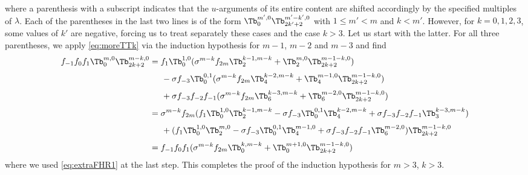 \documentclass[11pt]{article}
\numberwithin{equation}{section}
\theoremstyle{plain}
\numberwithin{equation}{section}
\renewcommand{\le}{\leqslant}
\begin{document}
where a parenthesis with a subscript indicates that the $u$-arguments of its entire content are shifted accordingly by the specified multiples of $\lambda$. Each of the parentheses in the last two lines is of the form $\Tb^{m',0}_0 \Tb^{m'-k',0}_{2k'+2}$ with $1\le m'<m$ and $k<m'$. However, for $k=0,1,2,3$, some values of $k'$ are negative, forcing us to treat separately these cases and the case $k>3$. Let us start with the latter. For all three parentheses, we apply \eqref{eq:moreTTk} via the induction hypothesis for $m\!-\!1$, $m\!-\!2$ and $m\!-\!3$ and find
\begingroup
\allowdisplaybreaks
\begin{alignat}{2}
f_{-1}f_0f_1\Tb^{m,0}_0 \Tb^{m-k,0}_{2k+2} &= f_1\Tb^{1,0}_0 (\sigma^{m-k}f_{2m} \Tb^{k-1,m-k}_2 + \Tb^{m,0}_2 \Tb^{m-1-k,0}_{2k+2}) 
\nonumber\\[0.1cm]&\hspace{0.5cm}
- \sigma f_{-3} \Tb^{0,1}_0(\sigma^{m-k}f_{2m} \Tb^{k-2,m-k}_4 + \Tb^{m-1,0}_4 \Tb^{m-1-k,0}_{2k+2}) 
\nonumber\\[0.1cm]&\hspace{0.5cm}
+ \sigma f_{-3}f_{-2}f_{-1} (\sigma^{m-k}f_{2m} \Tb^{k-3,m-k}_6 + \Tb^{m-2,0}_6 \Tb^{m-1-k,0}_{2k+2}) 
\nonumber\\[0.1cm]
& = \sigma^{m-k} f_{2m} (f_1\Tb^{1,0}_0\Tb^{k-1,m-k}_2 - \sigma f_{-3}\Tb^{0,1}_0 \Tb^{k-2,m-k}_4 +  \sigma f_{-3}f_{-2}f_{-1} \Tb^{k-3,m-k}_3) \nonumber\\[0.1cm]&\hspace{0.5cm}
+ (f_1\Tb^{1,0}_0\Tb^{m,0}_2 - \sigma f_{-3} \Tb^{0,1}_0\Tb^{m-1,0}_4+\sigma f_{-3}f_{-2}f_{-1}\Tb^{m-2,0}_6)\Tb^{m-1-k,0}_{2k+2}
\nonumber\\[0.1cm]& = f_{-1}f_0f_1(\sigma^{m-k}f_{2m} \Tb^{k,m-k}_0 + \Tb^{m+1,0}_0\Tb^{m-1-k,0}_{2k+2})
\end{alignat}
\endgroup
where we used \eqref{eq:extraFHR1} at the last step. This completes the proof of the induction hypothesis for $m>3$, $k > 3$.
\end{document}
